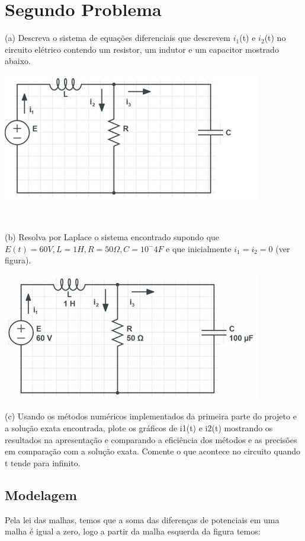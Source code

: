 \documentclass[12pt]{article}%
\begin{document}
\section{Segundo Problema}
     (a) Descreva o sistema de equações diferenciais que descrevem \(i_{1}\)(t) e \(i_{2}\)(t) no circuito elétrico contendo um resistor, um indutor e um capacitor mostrado abaixo.

    \begin{center}
        \includegraphics[scale=1.0]{problemas/p2a.png}
    \end{center}\
    
    (b) Resolva por Laplace o sistema encontrado supondo que \(E(t) = 60V, L = 1H, R = 50\Omega, C = 10^-4 F\) e que inicialmente \(i_{1} = i_{2} = 0\) (ver figura).

    \begin{center}
        \includegraphics[scale=1.0]{problemas/p2b.png}
    \end{center}
    
    (c) Usando os métodos numéricos implementados da primeira parte do projeto e a solução exata
encontrada, plote os gráficos de i1(t) e i2(t) mostrando os resultados na apresentação e comparando a
eficiência dos métodos e as precisões em comparação com a solução exata. Comente o que acontece no
circuito quando t tende para infinito.

    \subsection{Modelagem}
    Pela lei das malhas, temos que a soma das diferenças de potenciais em uma malha é igual a zero, logo a partir da malha esquerda da figura temos:
    
\end{document}
